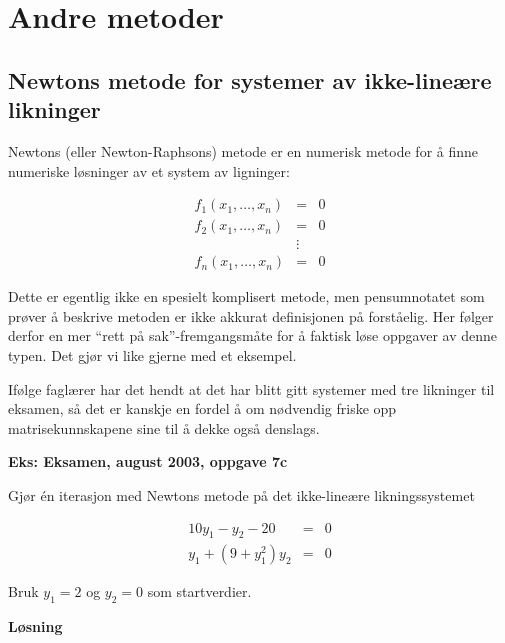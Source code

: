 \documentclass[norsk, a4paper, 12pt, titlepage]{article}
\begin{document}

\newpage
\section{Andre metoder}
\subsection{Newtons metode for systemer av ikke-lineære likninger}
Newtons (eller Newton-Raphsons) metode er en numerisk metode for å
finne numeriske løsninger av et system av ligninger:

\begin{eqnarray*}
f_{1}(x_{1}, \dots , x_{n}) & = & 0 \\
f_{2}(x_{1}, \dots , x_{n}) & = & 0 \\
& \vdots & \\
f_{n}(x_{1}, \dots , x_{n}) & = & 0
\end{eqnarray*}

Dette er egentlig ikke en spesielt komplisert metode, men
pensumnotatet som prøver å beskrive metoden er ikke akkurat
definisjonen på forståelig.  Her følger derfor en mer ``rett på
sak''-fremgangsmåte for å faktisk løse oppgaver av denne typen.  Det
gjør vi like gjerne med et eksempel.

Ifølge faglærer har det hendt at det har blitt gitt systemer med tre
likninger til eksamen, så det er kanskje en fordel å om nødvendig
friske opp matrisekunnskapene sine til å dekke også denslags.

\textbf{Eks: Eksamen, august 2003, oppgave 7c}

Gjør én iterasjon med Newtons metode på det ikke-lineære
likningssystemet

\begin{eqnarray*}
10y_{1} - y_{2} - 20 & = & 0 \\
y_{1} + (9 + y_{1}^{2})y_{2} & = & 0
\end{eqnarray*}

Bruk $y_{1} = 2$ og $y_{2} = 0$ som startverdier.

\textbf{Løsning}
\end{document}
